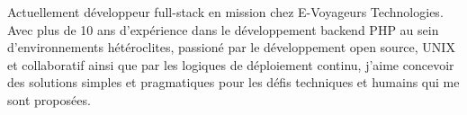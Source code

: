 

\begin{cvparagraph}

Actuellement développeur full-stack en mission chez E-Voyageurs Technologies. Avec plus de 10 ans d'expérience dans le développement backend PHP au sein d'environnements hétéroclites, passioné par le développement open source, UNIX et collaboratif ainsi que par les logiques de déploiement continu, j'aime concevoir des solutions simples et pragmatiques pour les défis techniques et humains qui me sont proposées.
\end{cvparagraph}
